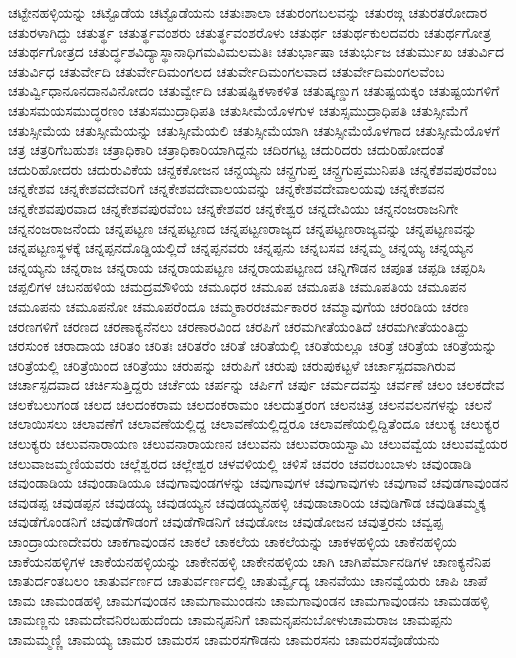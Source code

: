 {ಚಟ್ಟೇನಹಳ್ಳಿಯನ್ನು
ಚಟ್ಟೊಡೆಯ
ಚಟ್ಟೊಡೆಯನು
ಚತುಃಶಾಲಾ
ಚತುರಂಗಬಲವನ್ನು
ಚತುರಙ್ಗ
ಚತುರತರೋದಾರ
ಚತುರಳಾಗಿದ್ದು
ಚತುರ್ತ್ಥ
ಚತುರ್ತ್ಥವಂಶರು
ಚತುರ್ತ್ಥವಂಶರೊಳು
ಚತುರ್ಥ
ಚತುರ್ಥಕುಲದವರು
ಚತುರ್ಥಗೋತ್ರ
ಚತುರ್ಥಗೋತ್ರದ
ಚತುರ್ದ್ಧಶವಿದ್ಯಾಸ್ಥಾನಾಧಿಗಮವಿಮಲಮತಿಃ
ಚತುರ್ಭಾಷಾ
ಚತುರ್ಭುಜ
ಚತುರ್ಮುಖ
ಚತುರ್ವಿದ
ಚತುರ್ವಿಧ
ಚತುರ್ವೇದಿ
ಚತುರ್ವೇದಿಮಂಗಲದ
ಚತುರ್ವೇದಿಮಂಗಲವಾದ
ಚತುರ್ವೇದಿಮಂಗಲವೆಂಬ
ಚತುರ್ವ್ವಿಧಾನೂನದಾನವಿನೋದಂ
ಚತುರ್ವ್ವೇದಿ
ಚತುಷಷ್ಟಿಕಳಾಕಳಿತ
ಚತುಷ್ಕಣ್ಡುಗ
ಚತುಷ್ಟಯಕ್ಕಂ
ಚತುಷ್ಟಯಗಳಿಗೆ
ಚತುಸಮಯಸಮುದ್ಧರಣಂ
ಚತುಸಮುದ್ರಾಧಿಪತಿ
ಚತುಸೀಮೆಯೊಳಗುಳ
ಚತುಸ್ಸಮುದ್ರಾಧಿಪತಿ
ಚತುಸ್ಸೀಮೆಗೆ
ಚತುಸ್ಸೀಮೆಯ
ಚತುಸ್ಸೀಮೆಯನ್ನು
ಚತುಸ್ಸೀಮೆಯಲಿ
ಚತುಸ್ಸೀಮೆಯಾಗಿ
ಚತುಸ್ಸೀಮೆಯೊಳಗಾದ
ಚತುಸ್ಸೀಮೆಯೊಳಗೆ
ಚತ್ರ
ಚತ್ರರಿಗೆಬಹುಶಃ
ಚತ್ರಾಧಿಕಾರಿ
ಚತ್ರಾಧಿಕಾರಿಯಾಗಿದ್ದನು
ಚದಿರಗಟ್ಟ
ಚದುರಿದರು
ಚದುರಿಹೋದಂತೆ
ಚದುರಿಹೋದರು
ಚದುರುವಿಕೆಯ
ಚನ್ದಕಕೋಜನ
ಚನ್ದಯ್ಯನು
ಚನ್ದ್ರಗುಪ್ತ
ಚನ್ದ್ರಗುಪ್ತಮುನಿಪತಿ
ಚನ್ನಕೆಶವಪುರವೆಂಬ
ಚನ್ನಕೇಶವ
ಚನ್ನಕೇಶವದೇವರಿಗೆ
ಚನ್ನಕೇಶವದೇವಾಲಯವನ್ನು
ಚನ್ನಕೇಶವದೇವಾಲಯವು
ಚನ್ನಕೇಶವನ
ಚನ್ನಕೇಶವಪುರವಾದ
ಚನ್ನಕೇಶವಪುರವೆಂಬ
ಚನ್ನಕೇಶವರ
ಚನ್ನಕೇಶ್ವರ
ಚನ್ನದೇವಿಯು
ಚನ್ನನಂಜರಾಜನಿಗೇ
ಚನ್ನನಂಜರಾಜನೆಂದು
ಚನ್ನಪಟ್ಟಣ
ಚನ್ನಪಟ್ಟಣದ
ಚನ್ನಪಟ್ಟಣರಾಜ್ಯದ
ಚನ್ನಪಟ್ಟಣರಾಜ್ಯವನ್ನು
ಚನ್ನಪಟ್ಟಣವನ್ನು
ಚನ್ನಪಟ್ಟಣಸ್ಥಳಕ್ಕೆ
ಚನ್ನಪ್ಪನದೊಡ್ಡಿಯಲ್ಲಿದೆ
ಚನ್ನಪ್ಪನವರು
ಚನ್ನಪ್ಪನು
ಚನ್ನಬಸವ
ಚನ್ನಮ್ಮ
ಚನ್ನಯ್ಯ
ಚನ್ನಯ್ಯನ
ಚನ್ನಯ್ಯನು
ಚನ್ನರಾಜ
ಚನ್ನರಾಯ
ಚನ್ನರಾಯಪಟ್ಟಣ
ಚನ್ನರಾಯಪಟ್ಟಣದ
ಚನ್ನಿಗೌಡನ
ಚಪೂತ
ಚಪ್ಪಡಿ
ಚಪ್ಪರಿಸಿ
ಚಪ್ಪಲಿಗಳ
ಚಬನಹಳಿಯ
ಚಮದ್ರಮೌಳಿಯ
ಚಮೂಧರ
ಚಮೂಪ
ಚಮೂಪತಿ
ಚಮೂಪತಿಯ
ಚಮೂಪನ
ಚಮೂಪನು
ಚಮೂಪನೋ
ಚಮೂಪರೆಂದೂ
ಚಮ್ಮಕಾರರಚರ್ಮಕಾರರ
ಚಮ್ಮಾವುಗೆಯ
ಚರಂಡಿಯ
ಚರಣ
ಚರಣಗಳಿಗೆ
ಚರಣದ
ಚರಣಾಕ್ಯನೆನಲು
ಚರಣಾರವಿಂದ
ಚರಪಿಗೆ
ಚರಮಗೀತೆಯಂತಿದೆ
ಚರಮಗೀತೆಯಂತಿದ್ದು
ಚರಸುಂಕ
ಚರಾದಾಯ
ಚರಿತಂ
ಚರಿತಃ
ಚರಿತರೆಂ
ಚರಿತೆ
ಚರಿತೆಯಲ್ಲಿ
ಚರಿತೆಯಲ್ಲೂ
ಚರಿತ್ರೆ
ಚರಿತ್ರೆಯ
ಚರಿತ್ರೆಯನ್ನು
ಚರಿತ್ರೆಯಲ್ಲಿ
ಚರಿತ್ರೆಯಿಂದ
ಚರಿತ್ರೆಯು
ಚರುಪನ್ನು
ಚರುಪಿಗೆ
ಚರುಪು
ಚರುಪುಕಟ್ಟಳೆ
ಚರ್ಚಾಸ್ಪದವಾಗಿರುವ
ಚರ್ಚಾಸ್ಪದವಾದ
ಚರ್ಚಿಸುತ್ತಿದ್ದರು
ಚರ್ಚೆಯ
ಚರ್ಪನ್ನು
ಚರ್ಪಿಗೆ
ಚರ್ಪು
ಚರ್ಮದವಸ್ತು
ಚರ್ವಣೆ
ಚಲಂ
ಚಲಕದೇವ
ಚಲಕೆಬಲುಗಂಡ
ಚಲದ
ಚಲದಂಕರಾಮ
ಚಲದಂಕರಾಮಂ
ಚಲದುತ್ತರಂಗ
ಚಲನಚಿತ್ರ
ಚಲನವಲನಗಳನ್ನು
ಚಲನೆ
ಚಲಾಯಿಸಲು
ಚಲಾವಣೆಗೆ
ಚಲಾವಣೆಯಲ್ಲಿದ್ದ
ಚಲಾವಣೆಯಲ್ಲಿದ್ದರೂ
ಚಲಾವಣೆಯಲ್ಲಿದ್ದಿತೆಂದೂ
ಚಲುಕ್ಯ
ಚಲುಕ್ಯರ
ಚಲುಕ್ಯರು
ಚಲುವನಾರಾಯಣ
ಚಲುವನಾರಾಯಣನ
ಚಲುವನು
ಚಲುವರಾಯಸ್ವಾಮಿ
ಚಲುವವ್ವೆಯ
ಚಲುವವ್ವೆಯರ
ಚಲುವಾಜಮ್ಮಣಿಯವರು
ಚಲ್ಲೆಶ್ವರದ
ಚಲ್ಲೇಶ್ವರ
ಚಳವಳಿಯಲ್ಲಿ
ಚಳಿಸೆ
ಚವರಂ
ಚವರಬಂಬಾಳು
ಚವುಂಡಾಡಿ
ಚವುಂಡಾಡಿಯ
ಚವುಂಡಾಡಿಯೂ
ಚವುಗಾವುಂಡಗಳನ್ನು
ಚವುಗಾವುಗಳ
ಚವುಗಾವುಗಳು
ಚವುಗಾವೆ
ಚವುಡಗಾವುಂಡನ
ಚವುಡಪ್ಪ
ಚವುಡಪ್ಪನ
ಚವುಡಯ್ಯ
ಚವುಡಯ್ಯನ
ಚವುಡಯ್ಯನಹಳ್ಳಿ
ಚವುಡಾಚಾರಿಯ
ಚವುಡಿಗೌಡ
ಚವುಡಿತಮ್ಮಕ್ಕ
ಚವುಡೆಗೊಂಡನಿಗೆ
ಚವುಡೆಗೌಡಂಗೆ
ಚವುಡೆಗೌಡನಿಗೆ
ಚವುಡೋಜ
ಚವುಡೋಜನ
ಚವುತ್ತರನು
ಚವ್ವಪ್ಪ
ಚಾಂದ್ರಾಯಣದೇವರು
ಚಾಕಗಾವುಂಡನ
ಚಾಕಲೆ
ಚಾಕಲೆಯ
ಚಾಕಲೆಯನ್ನು
ಚಾಕಳಹಳ್ಳಿಯ
ಚಾಕೆನಹಳ್ಳಿಯ
ಚಾಕೆಯನಹಳ್ಳಿಗಳ
ಚಾಕೆಯನಹಳ್ಳಿಯನ್ನು
ಚಾಕೇನಹಳ್ಳಿ
ಚಾಕೇನಹಳ್ಳಿಯ
ಚಾಗಿ
ಚಾಗಿಪೆರ್ಮಾನಡಿಗಳ
ಚಾಣಕ್ಯನೆನಿಪ
ಚಾತುರ್ದಂತಬಲಂ
ಚಾತುರ್ವರ್ಣದ
ಚಾತುರ್ವರ್ಣದಲ್ಲಿ
ಚಾತುರ್ವ್ವೈದ್ಯ
ಚಾನವೆಯು
ಚಾನವ್ವೆಯರು
ಚಾಪಿ
ಚಾಪೆ
ಚಾಮ
ಚಾಮಂಡಹಳ್ಳಿ
ಚಾಮಗವುಂಡನ
ಚಾಮಗಾಮುಂಡನು
ಚಾಮಗಾವುಂಡನ
ಚಾಮಗಾವುಂಡನು
ಚಾಮಡಹಳ್ಳಿ
ಚಾಮಣ್ಣನು
ಚಾಮದೇವನಿರಬಹುದೆಂದು
ಚಾಮನೃಪನಿಗೆ
ಚಾಮನೃಪನುಬೋಳುಚಾಮರಾಜ
ಚಾಮಪ್ಪನು
ಚಾಮಮ್ಮಣ್ಣಿ
ಚಾಮಯ್ಯ
ಚಾಮರ
ಚಾಮರಸ
ಚಾಮರಸಗೌಡನು
ಚಾಮರಸನು
ಚಾಮರಸವೊಡೆಯನು
}
